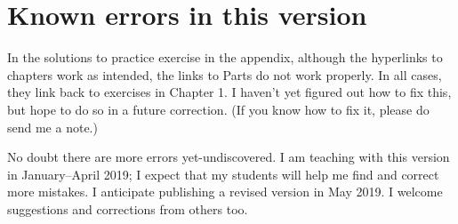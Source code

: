 \chapter*{Known errors in this version}
\label{ch.errors}

In the solutions to practice exercise in the appendix, although the hyperlinks to chapters work as intended, the links to Parts do not work properly. In all cases, they link back to exercises in Chapter 1. I haven't yet figured out how to fix this, but hope to do so in a future correction. (If you know how to fix it, please do send me a note.)

No doubt there are more errors yet-undiscovered. I am teaching with this version in January--April 2019; I expect that my students will help me find and correct more mistakes. I anticipate publishing a revised version in May 2019. I welcome suggestions and corrections from others too.